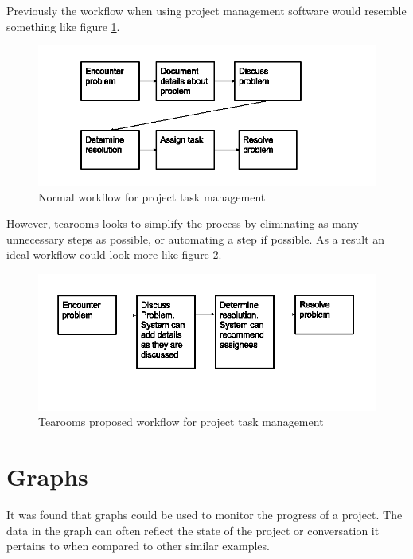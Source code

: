 \documentclass{l4proj}
\begin{document}
Previously the workflow when using project management software would resemble something like figure \ref{fig:1}.  


\begin{figure}[h]
\includegraphics[scale=0.75]{old-workflow.png}
\centering
\caption{Normal workflow for project task management}
\label{fig:1}
\end{figure}
\newpage

However, tearooms looks to simplify the process by eliminating as many unnecessary steps as possible, or automating a step if possible.  As a result an ideal workflow could look more like figure \ref{fig:2}. 

\begin{figure}[h]
\includegraphics[scale=0.75]{New-workflow.png}
\centering
\caption{Tearooms proposed workflow for project task management}
\label{fig:2}
\end{figure}

\section{Graphs}

It was found that graphs could be used to monitor the progress of a project. The data in the graph can often reflect the state of the project or conversation it pertains to when compared to other similar examples.
\end{document}
